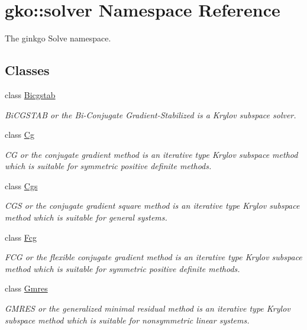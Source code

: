 \hypertarget{namespacegko_1_1solver}{}\section{gko\+:\+:solver Namespace Reference}
\label{namespacegko_1_1solver}


The ginkgo Solve namespace.  


\subsection*{Classes}
\begin{DoxyCompactItemize}
\item 
class \hyperlink{classgko_1_1solver_1_1Bicgstab}{Bicgstab}
\begin{DoxyCompactList}\small\item\em Bi\+C\+G\+S\+T\+AB or the Bi-\/\+Conjugate Gradient-\/\+Stabilized is a Krylov subspace solver. \end{DoxyCompactList}\item 
class \hyperlink{classgko_1_1solver_1_1Cg}{Cg}
\begin{DoxyCompactList}\small\item\em CG or the conjugate gradient method is an iterative type Krylov subspace method which is suitable for symmetric positive definite methods. \end{DoxyCompactList}\item 
class \hyperlink{classgko_1_1solver_1_1Cgs}{Cgs}
\begin{DoxyCompactList}\small\item\em C\+GS or the conjugate gradient square method is an iterative type Krylov subspace method which is suitable for general systems. \end{DoxyCompactList}\item 
class \hyperlink{classgko_1_1solver_1_1Fcg}{Fcg}
\begin{DoxyCompactList}\small\item\em F\+CG or the flexible conjugate gradient method is an iterative type Krylov subspace method which is suitable for symmetric positive definite methods. \end{DoxyCompactList}\item 
class \hyperlink{classgko_1_1solver_1_1Gmres}{Gmres}
\begin{DoxyCompactList}\small\item\em G\+M\+R\+ES or the generalized minimal residual method is an iterative type Krylov subspace method which is suitable for nonsymmetric linear systems. \end{DoxyCompactList}\item 

\end{DoxyCompactItemize}
